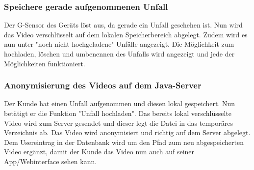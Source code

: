 \subsubsection{Speichere gerade aufgenommenen Unfall}
Der G-Sensor des Ger\"ats l\"ost aus, da gerade ein Unfall geschehen ist. Nun wird das Video verschl\"usselt auf dem lokalen Speicherbereich abgelegt. Zudem wird es nun unter "noch nicht hochgeladene" Unf\"alle angezeigt. Die M\"oglichkeit zum hochladen, l\"oschen und umbenennen des Unfalls wird angezeigt und jede der M\"oglichkeiten funktioniert.

\subsubsection{Anonymisierung des Videos auf dem Java-Server}
Der Kunde hat einen Unfall aufgenommen und diesen lokal gespeichert. Nun bet\"atigt er die Funktion "Unfall hochladen". Das bereits lokal verschl\"usselte Video wird zum Server gesendet und dieser legt die Datei in das tempor\"ares Verzeichnis ab. Das Video wird anonymisiert und richtig auf dem Server abgelegt. Dem Usereintrag in der Datenbank wird um den Pfad zum neu abgespeicherten Video erg\"anzt, damit der Kunde das Video nun auch auf seiner App/Webinterface sehen kann.
